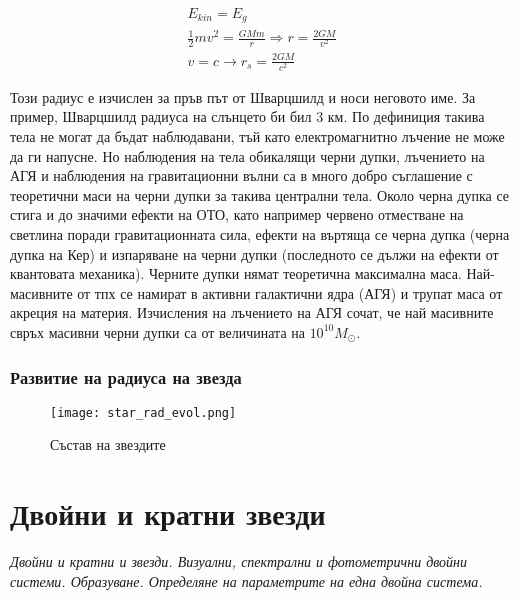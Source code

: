 \documentclass[a4paper,12pt]{article}
\begin{document}
\begin{gather}
    E_{kin} = E_g\\
    \frac{1}{2}mv^2 = \frac{GMm}{r}
    \Rightarrow r = \frac{2GM}{v^2}\\
    v=c \rightarrow r_s = \frac{2GM}{c^2}
\end{gather}

Този радиус е изчислен за пръв път от Шварцшилд и носи неговото име. За пример, Шварцшилд радиуса на слънцето би бил 3 км. По дефиниция такива тела не могат да бъдат наблюдавани, тъй като електромагнитно лъчение не може да ги напусне. Но наблюдения на тела обикалящи черни дупки, лъчението на АГЯ и наблюдения на гравитационни вълни са в много добро съглашение с теоретични маси на черни дупки за такива централни тела. Около черна дупка се стига и до значими ефекти на ОТО, като например червено отместване на светлина поради гравитационната сила, ефекти на въртяща се черна дупка (черна дупка на Кер) и изпаряване на черни дупки (последното се дължи на ефекти от квантовата механика). Черните дупки нямат теоретична максимална маса. Най-масивните от тпх се намират в активни галактични ядра (АГЯ) и трупат маса от акреция на материя. Изчисления на лъчението на АГЯ сочат, че най масивните свръх масивни черни дупки са от величината на $10^10 M_\odot$.




\subsubsection{Развитие на радиуса на звезда}

\begin{figure}[h!]
\centering
\texttt{[image: star\_rad\_evol.png]}
\caption{Състав на звездите}
\label{fig:star_rad_evol}
\end{figure}



\section{Двойни и кратни звезди}

\textit{Двойни и кратни и звезди. Визуални, спектрални и фотометрични двойни системи. Образуване. Определяне на параметрите на една двойна система.}\\
\end{document}
